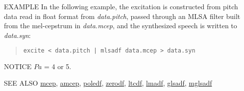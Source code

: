 \begin{qsection}{EXAMPLE}
In the following example,
the excitation is constructed from pitch data
read in float format from {\em data.pitch},
passed through an MLSA filter 
built from the mel-cepstrum in
{\em data.mcep},
and the synthesized speech is written to {\em data.syn}:
\begin{quote}
 \verb!excite < data.pitch | mlsadf data.mcep > data.syn!
\end{quote} 
\end{qsection}

\begin{qsection}{NOTICE}
$Pa$ = 4 or 5.
\end{qsection}

\begin{qsection}{SEE ALSO}
\hyperlink{mcep}{mcep},
\hyperlink{amcep}{amcep},
\hyperlink{poledf}{poledf},
\hyperlink{zerodf}{zerodf},
\hyperlink{ltcdf}{ltcdf},
\hyperlink{lmadf}{lmadf},
\hyperlink{glsadf}{glsadf},
\hyperlink{mglsadf}{mglsadf}
\end{qsection}
